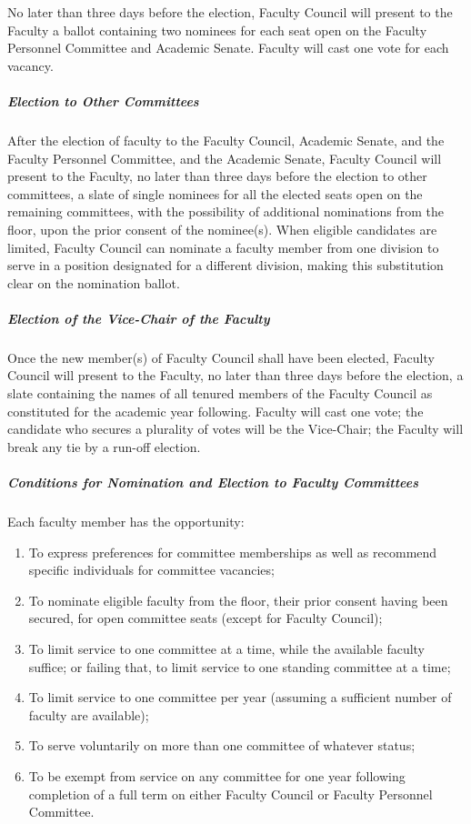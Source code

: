 \documentclass[letterpaper, 11pt]{article}
\begin{document}
					No later than three days before the election, Faculty Council will present to the Faculty a ballot containing two nominees for each seat open on the Faculty Personnel Committee and Academic Senate.  Faculty will cast one vote for each vacancy.
				\subparagraph{Election to Other Committees}
					After the election of faculty to the Faculty Council, Academic Senate, and the Faculty Personnel Committee, and the Academic Senate, Faculty Council will present to the Faculty, no later than three days before the election to other committees, a slate of single nominees for all the elected seats open on the remaining committees, with the possibility of additional nominations from the floor, upon the prior consent of the nominee(s).  When eligible candidates are limited, Faculty Council can nominate a faculty member from one division to serve in a position designated for a different division, making this substitution clear on the nomination ballot.
				\subparagraph{Election of the Vice-Chair of the Faculty}
					Once the new member(s) of Faculty Council shall have been elected, Faculty Council will present to the Faculty, no later than three days before the election, a slate containing the names of all tenured members of the Faculty Council as constituted for the academic year following.  Faculty will cast one vote; the candidate who secures a plurality of votes will be the Vice-Chair; the Faculty will break any tie by a run-off election.
				\subparagraph{Conditions for Nomination and Election to Faculty Committees}
					Each faculty member has the opportunity:
					\begin{enumerate}[label=\alph*)]
						\item{To express preferences for committee memberships as well as recommend specific individuals for committee vacancies;}
						\item{To nominate eligible faculty from the floor, their prior consent having been secured, for open committee seats (except for Faculty Council);}
						\item{To limit service to one committee at a time, while the available faculty suffice; or failing that, to limit service to one standing committee at a time;}
						\item{To limit service to one committee per year (assuming a sufficient number of faculty are available);}
						\item{To serve voluntarily on more than one committee of whatever status;}
						\item{To be exempt from service on any committee for one year following completion of a full term on either Faculty Council or Faculty Personnel Committee.}
					\end{enumerate}
\end{document}
